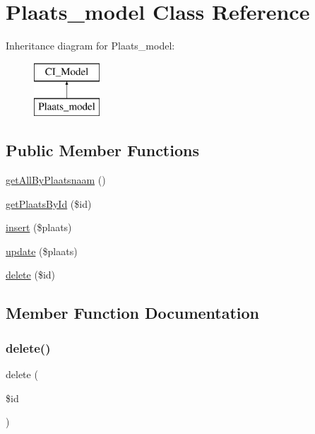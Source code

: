 \hypertarget{class_plaats__model}{}\section{Plaats\+\_\+model Class Reference}
\label{class_plaats__model}
Inheritance diagram for Plaats\+\_\+model\+:\begin{figure}[H]
\begin{center}
\leavevmode
\includegraphics[height=2.000000cm]{class_plaats__model}
\end{center}
\end{figure}
\subsection*{Public Member Functions}
\begin{DoxyCompactItemize}
\item 
\mbox{\hyperlink{class_plaats__model_a114ba0a4348ec4fb01b91fd2ae7f4ace}{get\+All\+By\+Plaatsnaam}} ()
\item 
\mbox{\hyperlink{class_plaats__model_a661d0b6b5be192049f4c0dc767b1724e}{get\+Plaats\+By\+Id}} (\$id)
\item 
\mbox{\hyperlink{class_plaats__model_a155f3c7004671ee2918823307c6adf74}{insert}} (\$plaats)
\item 
\mbox{\hyperlink{class_plaats__model_a7fc1a115f2b5bf6d11895a2cff35d83a}{update}} (\$plaats)
\item 
\mbox{\hyperlink{class_plaats__model_a2f8258add505482d7f00ea26493a5723}{delete}} (\$id)
\end{DoxyCompactItemize}


\subsection{Member Function Documentation}
\mbox{\label{class_plaats__model_a2f8258add505482d7f00ea26493a5723}} 
\subsubsection{\texorpdfstring{delete()}{delete()}}
{\footnotesize\ttfamily delete (\begin{DoxyParamCaption}\item[{}]{\$id }\end{DoxyParamCaption})}

